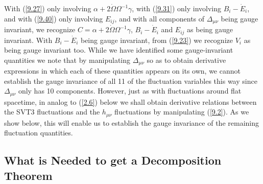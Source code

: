 \documentclass[aps,onecolumn,10pt]{revtex4}
\numberwithin{equation}{section}
\numberwithin{equation}{section}
\begin{document}
With (\ref{9.27}) only involving $\alpha +2\dot{\Omega}\Omega^{-1}\gamma$, with (\ref{9.31}) only involving 
$B_i-\dot{E}_i$, and with (\ref{9.40}) only involving $E_{ij}$, and with all components of $\Delta_{\mu\nu}$ being gauge invariant, we recognize $C=\alpha +2\dot{\Omega}\Omega^{-1}\gamma$, $B_i-\dot{E}_i$ and $E_{ij}$ as being gauge invariant. With $B_i-\dot{E}_i$ being gauge invariant, from (\ref{9.23}) we recognize $V_i$ as being gauge invariant too. While we have identified some gauge-invariant quantities we note that by manipulating $\Delta_{\mu\nu}$ so as to obtain derivative expressions in which each of these quantities appears on its own, we cannot establish the gauge invariance of all 11 of the fluctuation variables this way since $\Delta_{\mu\nu}$ only has 10 components. However, just as with fluctuations around flat spacetime, in analog to (\ref{2.6}) below we shall obtain derivative relations between the SVT3 fluctuations and the $h_{\mu\nu}$ fluctuations by manipulating  (\ref{9.2}). As we show below, this will enable us  to establish the gauge invariance of the remaining fluctuation quantities.

\subsection{What is Needed to get a Decomposition Theorem}
\end{document}
